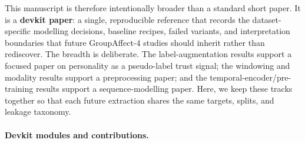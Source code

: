 \documentclass[sigconf,review,anonymous]{acmart}
\begin{document}
This manuscript is therefore intentionally broader than a standard short
paper.
It is a \textbf{devkit paper}: a single, reproducible reference that records
the dataset-specific modelling decisions, baseline recipes, failed variants,
and interpretation boundaries that future GroupAffect-4 studies should inherit
rather than rediscover.
The breadth is deliberate.
The label-augmentation results support a focused paper on personality as a
pseudo-label trust signal; the windowing and modality results support a
preprocessing paper; and the temporal-encoder/pre-training results support a
sequence-modelling paper.
Here, we keep these tracks together so that each future extraction shares the
same targets, splits, and leakage taxonomy.

\paragraph{Devkit modules and contributions.}
\end{document}
